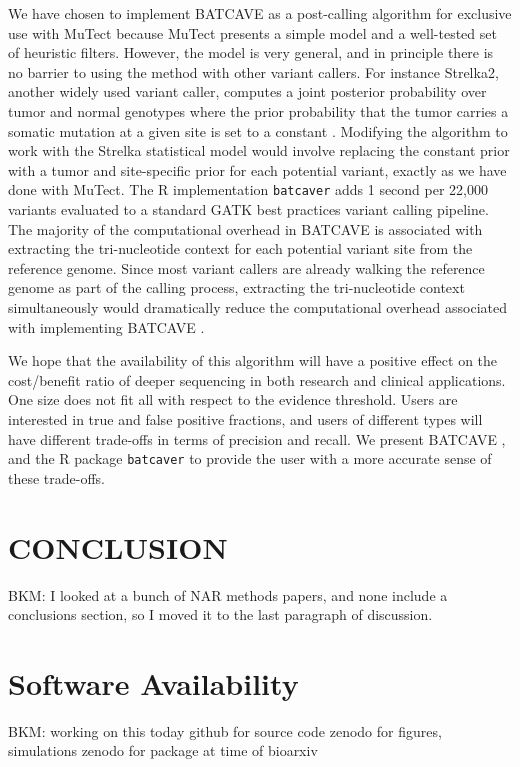\documentclass[a4,center,fleqn]{NAR}
\newcommand{\bkmcomment}[1]{{\color{blue}BKM: #1}}
\newcommand{\batcave}{BATCAVE }
\begin{document}
We have chosen to implement \batcave as a post-calling algorithm for exclusive use with MuTect because MuTect presents a simple model and a well-tested set of heuristic filters.
However, the model is very general, and in principle there is no barrier to using the method with other variant callers.
For instance Strelka2, another widely used variant caller, computes a joint posterior probability over tumor and normal genotypes where the prior probability that the tumor carries a somatic mutation at a given site is set to a constant \cite{Kim2018}.
Modifying the algorithm to work with the Strelka statistical model would involve replacing the constant prior with a tumor and site-specific prior for each potential variant, exactly as we have done with MuTect.
The R implementation \texttt{batcaver} adds 1 second per 22,000 variants evaluated to a standard GATK best practices variant calling pipeline. 
The majority of the computational overhead in \batcave is associated with extracting the tri-nucleotide context for each potential variant site from the reference genome.
Since most variant callers are already walking the reference genome as part of the calling process, extracting the tri-nucleotide context simultaneously would dramatically reduce the computational overhead associated with implementing \batcave.

We hope that the availability of this algorithm will have a positive effect on the cost/benefit ratio of deeper sequencing in both research and clinical applications.
One size does not fit all with respect to the evidence threshold. 
Users are interested in true and false positive fractions, and users of different types will have different trade-offs in terms of precision and recall.
We present \batcave, and the R package \texttt{batcaver} to provide the user with a more accurate sense of these trade-offs.

\section{CONCLUSION}
\bkmcomment{I looked at a bunch of NAR methods papers, and none include a conclusions section, so I moved it to the last paragraph of discussion.}

\section{Software Availability}
\bkmcomment{working on this today}
github for source code
zenodo for figures, simulations
zenodo for package at time of bioarxiv
\end{document}
